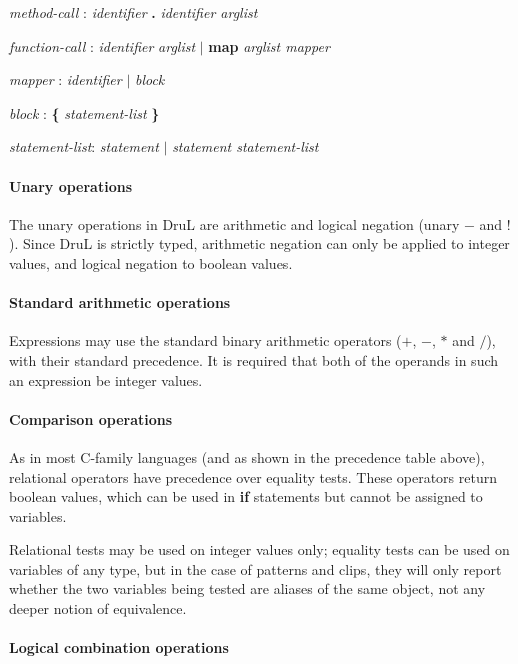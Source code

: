 \emph{method-call} : \emph{identifier} \textbf . \emph{identifier arglist} 

\emph{function-call} : \emph{identifier} \emph{arglist} $|$ \textbf{map} \emph{arglist mapper}

\emph{mapper} : \emph{identifier} $|$ \emph{block}

\emph{block} : \textbf{\{} \emph{statement-list} \textbf{\}} 

\emph{statement-list}: \emph{statement} $|$ \emph{statement statement-list}

\paragraph{Unary operations}

The unary operations in DruL are arithmetic and logical negation (unary $-$ and $!$).  Since DruL is strictly typed, arithmetic negation can only be applied to integer values, and logical negation to boolean values.

\paragraph{Standard arithmetic operations}

Expressions may use the standard binary arithmetic operators ($+$, $-$, $*$ and $/$), with their standard precedence.  It is required that both of the operands in such an expression be integer values.

\paragraph{Comparison operations}

As in most C-family languages (and as shown in the precedence table above), relational operators have precedence over equality tests.  These operators return boolean values, which can be used in \textbf{if} statements but cannot be assigned to variables.

Relational tests may be used on integer values only; equality tests can be used on variables of any type, but in the case of patterns and clips, they will only report whether the two variables being tested are  aliases of the same object, not any deeper notion of equivalence.

\paragraph{Logical combination operations}

